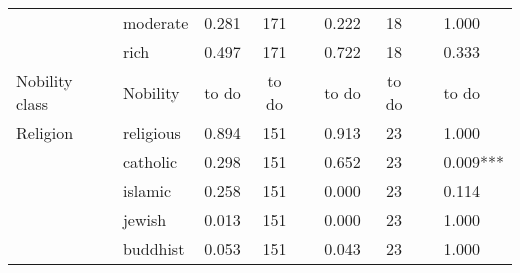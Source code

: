 \begin{table}[h!]
{\begin{threeparttable}
\begin{tabular}{llcclccll}
                                              & moderate                                      & 0.281                 & 171                         &                      & 0.222        & 18                 &                      & 1.000                                             \\
                                              & rich                                          & 0.497                 & 171                         &                      & 0.722        & 18                 &                      & 0.333                                             \\
\hline Nobility class                                & Nobility                                      & to do                 & to do                       &                      & to do        & to do              &                      & to do                                             \\
\hline Religion                                      & religious                                     & 0.894                 & 151                         &                      & 0.913        & 23                 &                      & 1.000                                             \\
                                              & catholic                                      & 0.298                 & 151                         &                      & 0.652        & 23                 &                      & 0.009***                                          \\
                                              & islamic                                       & 0.258                 & 151                         &                      & 0.000        & 23                 &                      & 0.114                                             \\
                                              & jewish                                        & 0.013                 & 151                         &                      & 0.000        & 23                 &                      & 1.000                                             \\
                                              & buddhist                                      & 0.053                 & 151                         &                      & 0.043        & 23                 &                      & 1.000                                             \\

\end{tabular}
\end{threeparttable}}
\end{table}
